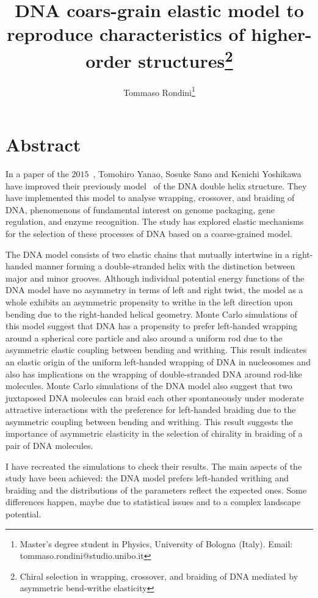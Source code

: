 \documentclass[a4paper,10pt]{article}
\title{DNA coars-grain elastic model to reproduce characteristics of higher-order structures\thanks{Chiral selection in wrapping, crossover, and braiding of DNA mediated by asymmetric bend-writhe elasticity\cite{main}}}
\author{Tommaso Rondini\thanks{Master's degree student in Physics, University of Bologna (Italy). Email: tommaso.rondini@studio.unibo.it}}
\begin{document}
\maketitle

\section*{Abstract}
In a paper of the $2015$~\cite{main}, Tomohiro Yanao, Sosuke Sano and Kenichi Yoshikawa have improved their previously model~\cite{old, very_old} of the DNA double helix structure.
They have implemented this model to analyse wrapping, crossover, and braiding of DNA, phenomenons of fundamental interest on genome packaging, gene regulation, and enzyme recognition.
The study has explored elastic mechanisms for the selection of these processes of DNA based on a coarse-grained model.

The DNA model consists of two elastic chains that mutually intertwine in a right-handed manner forming a double-stranded helix with the distinction between major and minor grooves.
Although individual potential energy functions of the DNA model have no asymmetry in terms of left and right twist, the model as a whole exhibits an asymmetric propensity to writhe in the left direction upon bending due to the right-handed helical geometry.
Monte Carlo simulations of this model suggest that DNA has a propensity to prefer left-handed wrapping around a spherical core particle and also around a uniform rod due to the asymmetric elastic coupling between bending and writhing.
This result indicates an elastic origin of the uniform left-handed wrapping of DNA in nucleosomes and also has implications on the wrapping of double-stranded DNA around rod-like molecules.
Monte Carlo simulations of the DNA model also suggest that two juxtaposed DNA molecules can braid each other spontaneously under moderate attractive interactions with the preference for left-handed braiding due to the asymmetric coupling between bending and writhing.
This result suggests the importance of asymmetric elasticity in the selection of chirality in braiding of a pair of DNA molecules.

I have recreated the simulations to check their results.
The main aspects of the study have been achieved: the DNA model prefers left-handed writhing and braiding and the distributions of the parameters reflect the expected ones.
Some differences happen, maybe due to statistical issues and to a complex landscape potential.
\end{document}
